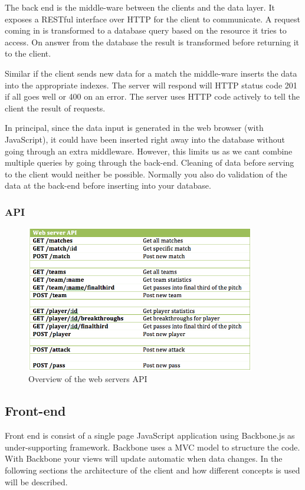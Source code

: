 The back end is the middle-ware between the clients and the data layer. It exposes a RESTful interface over HTTP for the client to communicate. A request coming in is transformed to a database query based on the resource it tries to access. On answer from the database the result is transformed before returning it to the client. 

Similar if the client sends new data for a match the middle-ware inserts the data into the appropriate indexes. The server will respond will HTTP status code 201 if all goes well or 400 on an error. The server uses HTTP code actively to tell the client the result of requests.

In principal, since the data input is generated in the web browser (with JavaScript), it could have been inserted right away into the database without going through an extra middleware. However, this limits us as we cant combine multiple queries by going through the back-end. Cleaning of data before serving to the client would neither be possible. Normally you also do validation of the data at the back-end before inserting into your database.

\subsubsection{API}

\begin{figure}[ht!]
\centering
\includegraphics[width=100mm]{images/implementation/API.png}
\caption{Overview of the web servers API}
\label{overflow}
\end{figure}

\subsection{Front-end}

Front end is consist of a single page JavaScript application using Backbone.js \footnotemark as under-supporting framework. Backbone uses a MVC model to structure the code. With Backbone your views will update automatic when data changes. In the following sections the architecture of the client and how different concepts is used will be described. 

